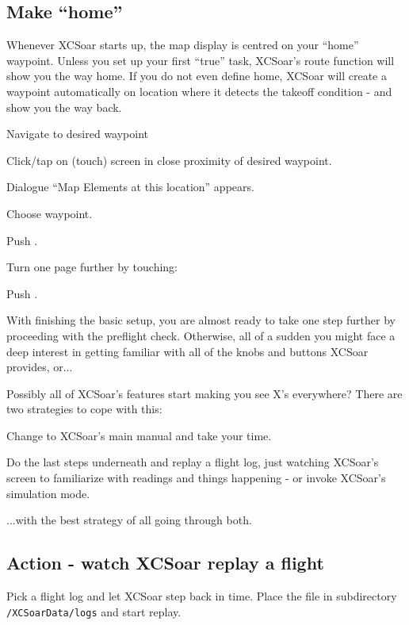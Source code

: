 \documentclass[english,a4paper,12pt]{refrep}
\begin{document}
\subsection{\textcolor{flashblue}{Make ``home''}}
Whenever XCSoar starts up, the map display is centred on your ``home'' 
waypoint. Unless you set up your first ``true'' task, XCSoar's route function will 
show you the way home. If you do not even define home, XCSoar will create a 
waypoint automatically on location where it detects the takeoff condition - and 
show you the way back.
\begin{compactitem}
\item Navigate to desired waypoint
\item Click/tap on (touch) screen in close proximity of desired waypoint.
\item Dialogue ``Map Elements at this location'' appears.
\item Choose waypoint.
\item Push .
\item Turn one page further by touching: \blink
\item Push .
\end{compactitem}

With finishing the basic setup, you are almost ready to take one step further 
by proceeding with the preflight check. Otherwise, all of a sudden you might 
face a deep interest in getting familiar with all of the knobs and buttons 
XCSoar provides, or...

Possibly all of XCSoar's features start making you see X's everywhere? There
are two strategies to cope with this:

\begin{compactitem}
\item Change to XCSoar's main manual and take your time.
\item Do the last steps underneath and replay a flight log, just watching 
XCSoar's screen to familiarize with readings and things happening - or invoke 
XCSoar's simulation mode.
\end{compactitem}

...with the best strategy of all going through both.

\subsection{\textcolor{flashblue}{Action - watch XCSoar replay a flight}}
Pick a flight log and let XCSoar step back in time.  Place the file in 
subdirectory \verb+/XCSoarData/logs+ and start replay.
\end{document}
